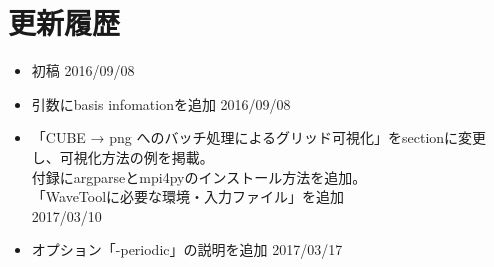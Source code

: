 \documentclass{jsarticle}
\begin{document}
\newpage

\section{更新履歴}
\begin{itemize}
\item 初稿 2016/09/08 
\item 引数にbasis infomationを追加 2016/09/08 
\item 「CUBE → png へのバッチ処理によるグリッド可視化」をsectionに変更し、可視化方法の例を掲載。\\
付録にargparseとmpi4pyのインストール方法を追加。\\
「WaveToolに必要な環境・入力ファイル」を追加\\
2017/03/10
\item オプション「-periodic」の説明を追加 2017/03/17\\


\end{itemize}
\end{document}

